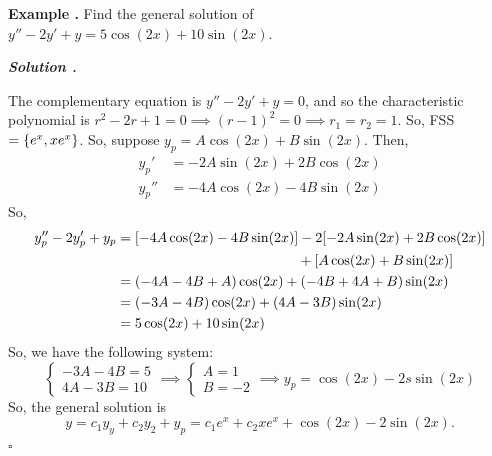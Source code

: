 \documentclass[12pt, a4paper]{article}
\newcounter{index}[subsection]
\newenvironment*{eg}{\begin{framed}\par\noindent\textbf{Example \thesubsection.\stepcounter{index}\theindex}}{\par\end{framed}}
\newcounter{nprf}[subsection]
\newenvironment*{sol}{\par\indent\textbf{\textit{Solution \stepcounter{nprf}\thenprf.}}\par}{\hfill{$\square$}\par}
\begin{document}
\begin{eg}
	Find the general solution of $y''-2y'+y=5\cos(2x)+10\sin(2x)$.
	\begin{sol}
		The complementary equation is $y''-2y'+y=0$, and so the characteristic polynomial is $r^2-2r+1=0\implies(r-1)^2=0\implies r_1=r_2=1$. So, FSS $=\qty{e^x,xe^x}$. So, suppose $y_p=A\cos(2x)+B\sin(2x)$. Then, \begin{align*}y_p'&=-2A\sin(2x)+2B\cos(2x)\\y_p''&=-4A\cos(2x)-4B\sin(2x)\end{align*} So, \begin{align*}y_p''-2y_p'+y_p&=\qty[-4A\cos(2x)-4B\sin(2x)]-2\qty[-2A\sin(2x)+2B\cos(2x)]\\&\qquad\qquad\qquad\qquad\qquad\qquad\quad+\qty[A\cos(2x)+B\sin(2x)]\\&=(-4A-4B+A)\cos(2x)+(-4B+4A+B)\sin(2x)\\&=(-3A-4B)\cos(2x)+(4A-3B)\sin(2x)\\&=5\cos(2x)+10\sin(2x)\end{align*} So, we have the following system: \[\begin{cases}-3A-4B=5\\4A-3B=10\end{cases}\implies\begin{cases}A=1\\B=-2\end{cases}\implies y_p=\cos(2x)-2s\sin(2x)\] So, the general solution is \[y=c_1y_y+c_2y_2+y_p=c_1e^x+c_2xe^x+\cos(2x)-2\sin(2x).\]
	\end{sol}
\end{eg}
\end{document}
